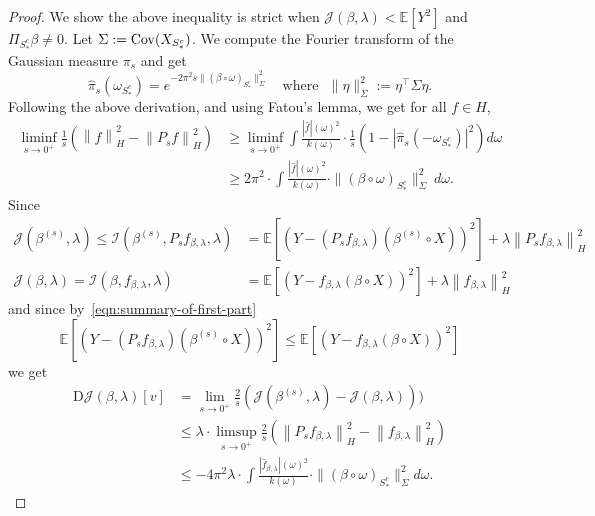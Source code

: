 \documentclass[sn-mathphys-num]{sn-jnl}%
\numberwithin{equation}{section}
\newcommand{\E}{\mathbb{E}}
\newcommand{\norm}[1]{\left\|{#1}\right\|} %
\newcommand{\Cov}{{\rm Cov}}
\theoremstyle{thmstyleone}%
\theoremstyle{thmstyletwo}%
\theoremstyle{thmstylethree}%
\begin{document}
\begin{proof}
We show the above inequality is strict when $\mathcal{J}(\beta, \lambda) < \E[Y^2]$ and $\Pi_{S_*^c} \beta \ne 0$. Let $\Sigma := \Cov(X_{S_*^c})$. We compute the Fourier transform of the Gaussian measure $\pi_s$ and get 
\begin{equation*}
	\widehat \pi_s (\omega_{S_*^c}) = e^{-2\pi^2  s\|(\beta \circ \omega)_{S_*^c}\|^2_\Sigma}\,\,~~~\text{where}~~~\|\eta\|^2_\Sigma := \eta^\top \Sigma \eta.
\end{equation*}
Following the above derivation, and using Fatou's lemma, we get for all $f \in H$,
\begin{equation*}
\begin{split} 
	\liminf_{s \to 0^+} \frac{1}{s} (\norm{f}_H^2 - \norm{P_s f}_H^2) 
		&\ge \liminf_{s \to 0^+} \int \frac{|\widehat {f} |(\omega)^2}{k(\omega)} \cdot  \frac{1}{s} (1-|\widehat \pi_s (-\omega_{S_*^c})|^2) d\omega \\
		&\ge  2\pi^2 \cdot \int \frac{|\widehat {f} |(\omega)^2}{k(\omega)} \cdot  \|(\beta \circ \omega)_{S_*^c}\|^2_\Sigma ~d\omega.
\end{split} 
\end{equation*} 
Since 
\begin{equation*}
\begin{split}
	\mathcal{J}(\beta^{(s)}, \lambda) \le \mathcal{I}(\beta^{(s)}, P_s f_{\beta, \lambda}, \lambda) 
		&= \E[(Y - (P_s f_{\beta, \lambda})(\beta^{(s)} \circ X))^2] + \lambda \norm{P_s f_{\beta, \lambda}}_H^2 \\
	\mathcal{J}(\beta, \lambda) = \mathcal{I}(\beta,  f_{\beta, \lambda}, \lambda) 
		&= \E[(Y - f_{\beta, \lambda}(\beta \circ X))^2] + \lambda \norm{f_{\beta, \lambda} }_H^2
\end{split} 
\end{equation*} 
and since by~\eqref{eqn:summary-of-first-part}
\begin{equation*}
	\E[(Y - (P_s f_{\beta, \lambda})(\beta^{(s)} \circ X))^2]	\le  \E[(Y - f_{\beta, \lambda}(\beta \circ X))^2]
\end{equation*} 
we get 
\begin{equation*}
\begin{split} 
	\mathrm{D}\mathcal{J}(\beta, \lambda)[v] &= 
		\lim_{s \to 0^+} \frac{2}{s} ( \mathcal{J}(\beta^{(s)}, \lambda) - \mathcal{J}(\beta, \lambda))) \\
		&\le \lambda \cdot \limsup_{s \to 0^+} \frac{2}{s} ( \norm{P_s f_{\beta, \lambda}}_H^2 - \norm{f_{\beta, \lambda}}_H^2) \\
		&\le -4\pi^2 \lambda \cdot  \int \frac{|\widehat {f}_{\beta, \lambda} |(\omega)^2}{k(\omega)} \cdot  \|(\beta \circ \omega)_{S_*^c}\|^2_\Sigma d\omega.

\end{split}
\end{equation*}
\end{proof}
\end{document}
